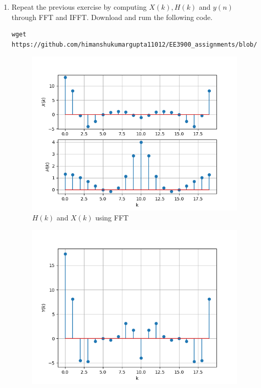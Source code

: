 \documentclass[journal,12pt,twocolumn]{IEEEtran}
\renewcommand\thesection{\arabic{section}}
\begin{document}
\begin{enumerate}[label=\thesection.\arabic*]
\item Repeat the previous exercise by computing $X(k), H(k)$ and $y(n)$ through FFT and 
IFFT.
\solution Download and rum the following code.
\begin{lstlisting}
wget https://github.com/himanshukumargupta11012/EE3900_assignments/blob/master/assignment_1/ques_6/fft_ifft.py
\end{lstlisting}
\begin{figure}[!ht]
	\centering
	\includegraphics[width=\columnwidth]{./ques_6/X_H_fft.png}
	\caption{$H(k)$ and $X(k)$ using FFT}
	\label{fig:X_h_fft}
\end{figure}
\begin{figure}[!ht]
	\centering
	\includegraphics[width=\columnwidth]{./ques_6/Y_fft}

\end{figure}
\end{enumerate}
\end{document}
